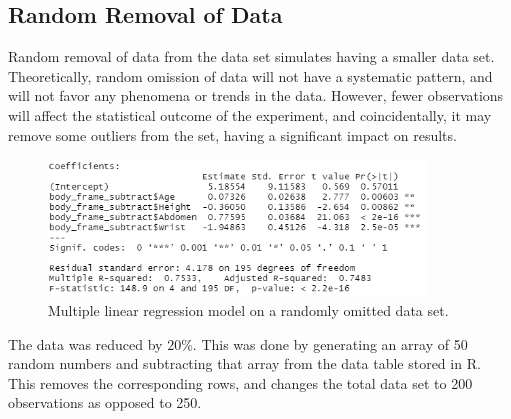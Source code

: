 \documentclass[12pt]{article}
\begin{document}
\subsection*{Random Removal of Data}

Random removal of data from the data set simulates having a smaller data set. Theoretically, random omission of data will not have a systematic pattern, and will not favor any phenomena or trends in the data. However, fewer observations will affect the statistical outcome of the experiment, and coincidentally, it may remove some outliers from the set, having a significant impact on results. 

\begin{figure}[h]
\centering
\includegraphics[width = 100mm]{reduced_results.PNG}
\caption{Multiple linear regression model on a randomly omitted data set.}
\label{stepmodel_reduced_omitted}
\end{figure}



The data was reduced by $20\%$. This was done by generating an array of 50 random numbers and subtracting that array from the data table stored in R. This removes the corresponding rows, and changes the total data set to 200 observations as opposed to 250.
\end{document}
